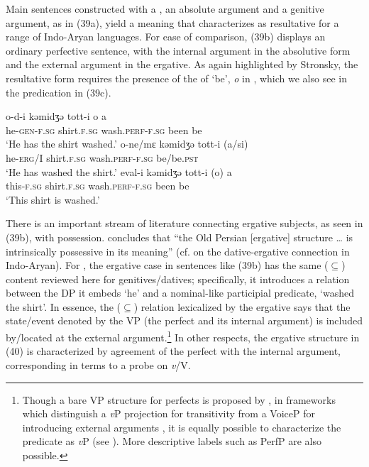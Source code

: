 \documentclass[output=paper]{langsci/langscibook}
\begin{document}
Main sentences constructed with a , an absolute argument and a genitive argument, as in (39a), yield a meaning that \citet{Stroński2013} characterizes as resultative for a range of Indo-Aryan languages. For ease of comparison, (39b) displays an ordinary perfective sentence, with the internal argument in the absolutive form and the external argument in the ergative. As again highlighted by Stronsky, the resultative form requires the presence of the  of ‘be’, \textit{o} in , which we also see in the  predication in (39c).

\ea%
    \label{ex:manzini:39}
    \ea
    \gll o-d-i    kəmidʒə  tott-i       o  a\\
         he-\textsc{gen-f.sg}  shirt.\textsc{f.sg}   wash.\textsc{perf-f.sg}  been  be \\
    \glt ‘He has the shirt washed.’
    \ex 
    \gll o-ne/mɛ  kəmidʒə   tott-i       (a/si)\\
         he-\textsc{erg}/I  shirt.\textsc{f.sg}   wash.\textsc{perf-f.sg}   be/be.\textsc{pst}\\
    \glt ‘He has washed the shirt.’
    \ex 
    \gll eval-i     kəmidʒə   tott-i       (o)  a\\
         this-\textsc{f.sg}    shirt.\textsc{f.sg}   wash.\textsc{perf-f.sg}   been  be \\
    \glt ‘This shirt is washed.’
    \z
\z

There is an important stream of literature connecting ergative subjects, as seen in  (39b), with possession. \citet[176–186]{Benveniste1966} concludes that “the Old Persian [ergative] structure … is intrinsically possessive in its meaning” (cf. \citealt{Butt2006} on the dative-ergative connection in Indo-Aryan). For \citet{Manzini2015}, the ergative case in sentences like (39b) has the same ($\subseteq$) content reviewed here for genitives\slash datives; specifically, it introduces a relation between the DP it embeds ‘he’ and a nominal-like participial predicate, ‘washed the shirt’. In essence, the ($\subseteq$) relation lexicalized by the ergative says that the state\slash event denoted by the VP (the perfect and its internal argument) is included by\slash located at the external argument.\footnote{{Though a bare VP structure for  perfects is proposed by \citet{Manzini2015}, in frameworks which distinguish a} {\textit{v}}{P projection for transitivity from a VoiceP for introducing external arguments \citep{Harley2013}, it is equally possible to characterize the predicate as} {\textit{v}}{P (see \citealt{Nash2014}). More descriptive labels such as PerfP are also possible.}} In other respects, the ergative structure in (40) is characterized by agreement of the perfect  with the internal argument, corresponding in  terms to a probe on \textit{v}/V.
\end{document}
